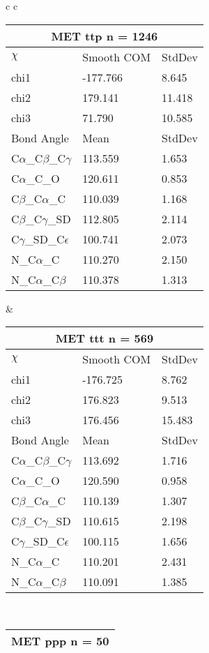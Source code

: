\begin{longtable}{ c c }
  \begin{tabular}{ l l l }
  \toprule
  \multicolumn{3}{c}{MET \textbf{ttp} n = 1246} \\ \toprule
  $\chi$       & Smooth COM & StdDev \\ \midrule
  chi1 & -177.766 & 8.645 \\ 
  chi2 & 179.141 & 11.418 \\ 
  chi3 & 71.790 & 10.585 \\ \midrule
  Bond Angle   & Mean     & StdDev \\ \midrule
  C$\alpha$\_C$\beta$\_C$\gamma$ & 113.559 & 1.653\\
  C$\alpha$\_C\_O & 120.611 & 0.853\\
  C$\beta$\_C$\alpha$\_C & 110.039 & 1.168\\
  C$\beta$\_C$\gamma$\_SD & 112.805 & 2.114\\
  C$\gamma$\_SD\_C$\epsilon$ & 100.741 & 2.073\\
  N\_C$\alpha$\_C & 110.270 & 2.150\\
  N\_C$\alpha$\_C$\beta$ & 110.378 & 1.313\\
  \bottomrule
  \end{tabular}
  &
  \begin{tabular}{ l l l }
  \toprule
  \multicolumn{3}{c}{MET \textbf{ttt} n = 569} \\ \toprule
  $\chi$       & Smooth COM & StdDev \\ \midrule
  chi1 & -176.725 & 8.762 \\ 
  chi2 & 176.823 & 9.513 \\ 
  chi3 & 176.456 & 15.483 \\ \midrule
  Bond Angle   & Mean     & StdDev \\ \midrule
  C$\alpha$\_C$\beta$\_C$\gamma$ & 113.692 & 1.716\\
  C$\alpha$\_C\_O & 120.590 & 0.958\\
  C$\beta$\_C$\alpha$\_C & 110.139 & 1.307\\
  C$\beta$\_C$\gamma$\_SD & 110.615 & 2.198\\
  C$\gamma$\_SD\_C$\epsilon$ & 100.115 & 1.656\\
  N\_C$\alpha$\_C & 110.201 & 2.431\\
  N\_C$\alpha$\_C$\beta$ & 110.091 & 1.385\\
  \bottomrule
  \end{tabular}
  \\
  \begin{tabular}{ l l l }
  \toprule
  \multicolumn{3}{c}{MET \textbf{ppp} n = 50} \\ \toprule

\end{tabular}
\end{longtable}
